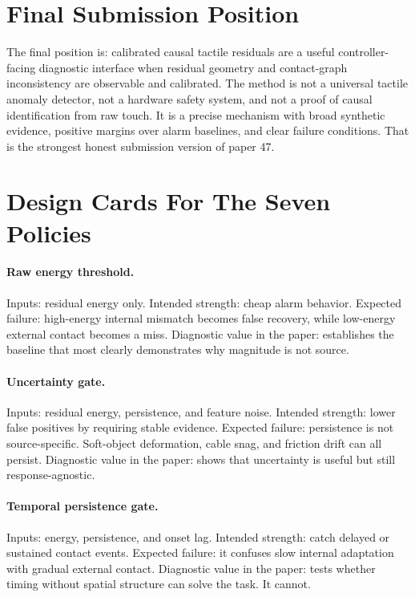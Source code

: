 \documentclass{article}
\begin{document}
\section{Final Submission Position}

The final position is: calibrated causal tactile residuals are a useful controller-facing diagnostic interface when residual geometry and contact-graph inconsistency are observable and calibrated. The method is not a universal tactile anomaly detector, not a hardware safety system, and not a proof of causal identification from raw touch. It is a precise mechanism with broad synthetic evidence, positive margins over alarm baselines, and clear failure conditions. That is the strongest honest submission version of paper 47.

\section{Design Cards For The Seven Policies}

\paragraph{Raw energy threshold.}
Inputs: residual energy only. Intended strength: cheap alarm behavior. Expected failure: high-energy internal mismatch becomes false recovery, while low-energy external contact becomes a miss. Diagnostic value in the paper: establishes the baseline that most clearly demonstrates why magnitude is not source.

\paragraph{Uncertainty gate.}
Inputs: residual energy, persistence, and feature noise. Intended strength: lower false positives by requiring stable evidence. Expected failure: persistence is not source-specific. Soft-object deformation, cable snag, and friction drift can all persist. Diagnostic value in the paper: shows that uncertainty is useful but still response-agnostic.

\paragraph{Temporal persistence gate.}
Inputs: energy, persistence, and onset lag. Intended strength: catch delayed or sustained contact events. Expected failure: it confuses slow internal adaptation with gradual external contact. Diagnostic value in the paper: tests whether timing without spatial structure can solve the task. It cannot.
\end{document}

